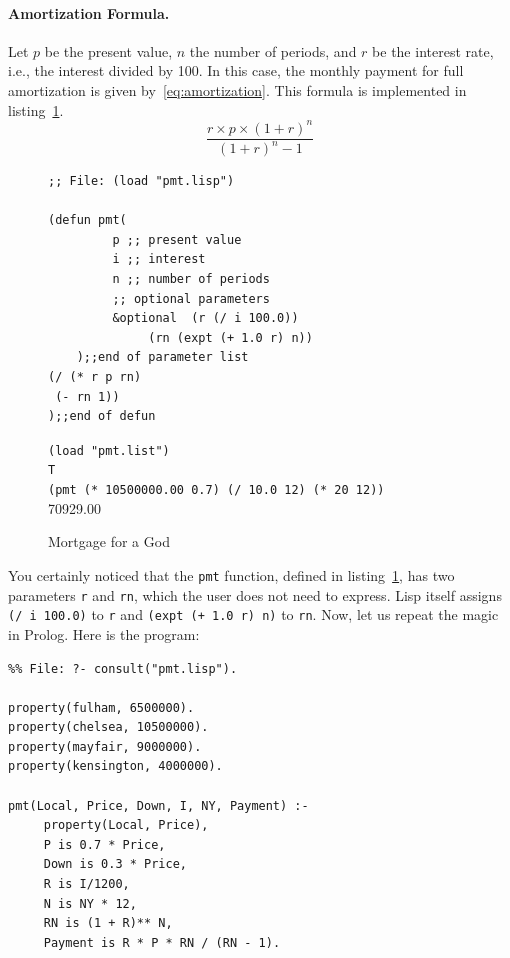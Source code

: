 \documentclass[a4paper,12pt]{book}
\newenvironment{fmpage}[1]
           {\begin{lrbox}{\fmbox}\begin{minipage}{#1}}
           {\end{minipage}\end{lrbox}\fbox{\usebox{\fmbox}}}
\begin{document}
\paragraph{Amortization Formula.} Let $p$ be the
present value, $n$ the number of periods,
and $r$ be the
interest rate, i.e., the interest divided by 100.
In this case, the monthly payment for full
amortization is given by~\ref{eq:amortization}.
This formula is implemented in
listing~\ref{Pan:mortgage}.
\begin{equation}
\frac{r\times p\times(1+r)^n}{(1+r)^n - 1}
\label{eq:amortization}
\end{equation}

\begin{figure}[!h]
\begin{fmpage}{0.9\textwidth}
\begin{verbatim}
;; File: (load "pmt.lisp")

(defun pmt( 
         p ;; present value
         i ;; interest 
         n ;; number of periods
         ;; optional parameters
         &optional  (r (/ i 100.0)) 
              (rn (expt (+ 1.0 r) n)) 
    );;end of parameter list
(/ (* r p rn)
 (- rn 1))
);;end of defun
\end{verbatim}
\end{fmpage}

\begin{fmpage}{0.9\textwidth}
\verb|(load "pmt.list")|\\
\verb|T|\\
\verb|(pmt (* 10500000.00 0.7) (/ 10.0 12) (* 20 12))|\\
70929.00
\end{fmpage}
\caption{Mortgage for a God}
\label{Pan:mortgage}
\end{figure}

You certainly noticed that the
\verb|pmt| function, defined
in listing~\ref{Pan:mortgage},
has two parameters \verb|r| and \verb|rn|,
which the user does not need
to express. Lisp itself
assigns \verb|(/ i 100.0)| to \verb|r|
and \verb|(expt (+ 1.0 r) n)| to \verb|rn|.
Now, let us repeat the magic in Prolog. Here is
the program:\\


\begin{fmpage}{0.9\textwidth}
\begin{verbatim}
%% File: ?- consult("pmt.lisp").

property(fulham, 6500000).
property(chelsea, 10500000).
property(mayfair, 9000000).
property(kensington, 4000000).

pmt(Local, Price, Down, I, NY, Payment) :-
     property(Local, Price),
     P is 0.7 * Price,
     Down is 0.3 * Price,
     R is I/1200,
     N is NY * 12,
     RN is (1 + R)** N,
     Payment is R * P * RN / (RN - 1).

\end{verbatim}
\end{fmpage}
\end{document}
